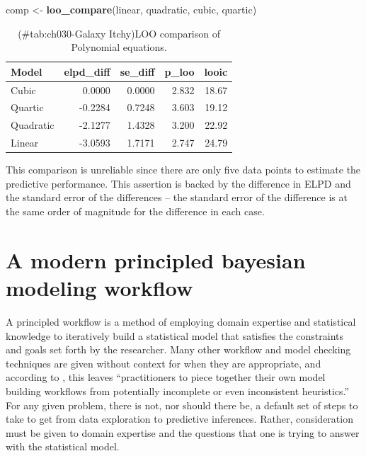 \documentclass[11pt, oneside, openany]{scrbook}
\newenvironment{Shaded}{\begin{snugshade}}{\end{snugshade}}
\newcommand{\KeywordTok}[1]{\textcolor[rgb]{0.13,0.29,0.53}{\textbf{#1}}}
\newcommand{\NormalTok}[1]{#1}
\newcommand{\StringTok}[1]{\textcolor[rgb]{0.31,0.60,0.02}{#1}}
\begin{document}
\begin{Shaded}
\begin{Highlighting}[]
\NormalTok{comp <-}\StringTok{ }\KeywordTok{loo_compare}\NormalTok{(linear, quadratic, cubic, quartic)}
\end{Highlighting}
\end{Shaded}

\begin{table}[!h]

\caption{(\#tab:ch030-Galaxy Itchy)LOO comparison of Polynomial equations.}
\centering
\begin{tabular}[t]{lrrrr}
\toprule
Model & elpd\_diff & se\_diff & p\_loo & looic\\
\midrule
Cubic & 0.0000 & 0.0000 & 2.832 & 18.67\\
Quartic & -0.2284 & 0.7248 & 3.603 & 19.12\\
Quadratic & -2.1277 & 1.4328 & 3.200 & 22.92\\
Linear & -3.0593 & 1.7171 & 2.747 & 24.79\\
\bottomrule
\end{tabular}
\end{table}

This comparison is unreliable since there are only five data points to estimate the predictive performance. This assertion is backed by the difference in ELPD and the standard error of the differences -- the standard error of the difference is at the same order of magnitude for the difference in each case.

\hypertarget{a-modern-principled-bayesian-modeling-workflow}{%
\section{A modern principled bayesian modeling workflow}\label{a-modern-principled-bayesian-modeling-workflow}}

A principled workflow is a method of employing domain expertise and statistical knowledge to iteratively build a statistical model that satisfies the constraints and goals set forth by the researcher. Many other workflow and model checking techniques are given without context for when they are appropriate, and according to \citet{betancourt2020}, this leaves ``practitioners to piece together their own model building workflows from potentially incomplete or even inconsistent heuristics.'' For any given problem, there is not, nor should there be, a default set of steps to take to get from data exploration to predictive inferences. Rather, consideration must be given to domain expertise and the questions that one is trying to answer with the statistical model.
\end{document}
